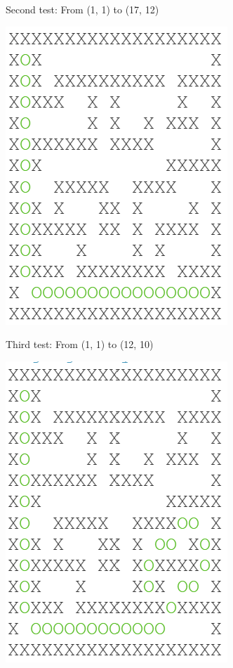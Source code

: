 \documentclass[../Main.tex]{subfiles}
\begin{document}
\begin{multicols*}{3}
            \columnbreak
            Second test: From (1, 1) to (17, 12) \par
            \centerline{\includegraphics[width=0.75\linewidth]{img/Design/AStarPrototype2.png}}


            \columnbreak
            Third test: From (1, 1) to (12, 10) \par
            \centerline{\includegraphics[width=0.8\linewidth]{img/Design/AStarPrototype3.png}}
        \end{multicols*}
\end{document}
